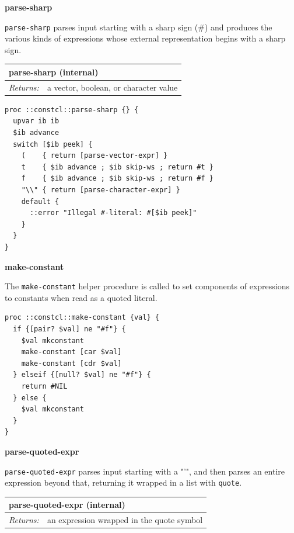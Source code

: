 \documentclass[twoside,9pt]{report}
\begin{document}
\textbf{parse-sharp}


\texttt{parse-sharp} parses input starting with a sharp sign (\#) and produces the various kinds of expressions whose external representation begins with a sharp sign.

\begin{tabular}{ |l l| }
\hline
\multicolumn{2}{|l|}{parse-sharp (internal)} \\
\hline
\textit{Returns:} & a vector, boolean, or character value \\
\hline
\end{tabular}

\noindent\makebox[\linewidth]{\rule{\linewidth}{0.4pt}}
\begin{lstlisting}
proc ::constcl::parse-sharp {} {
  upvar ib ib
  $ib advance
  switch [$ib peek] {
    (    { return [parse-vector-expr] }
    t    { $ib advance ; $ib skip-ws ; return #t }
    f    { $ib advance ; $ib skip-ws ; return #f }
    "\\" { return [parse-character-expr] }
    default {
      ::error "Illegal #-literal: #[$ib peek]"
    }
  }
}
\end{lstlisting}
\noindent\makebox[\linewidth]{\rule{\linewidth}{0.4pt}}

\textbf{make-constant}


The \texttt{make-constant} helper procedure is called to set components of expressions to constants when read as a quoted literal.

\noindent\makebox[\linewidth]{\rule{\linewidth}{0.4pt}}
\begin{lstlisting}
proc ::constcl::make-constant {val} {
  if {[pair? $val] ne "#f"} {
    $val mkconstant
    make-constant [car $val]
    make-constant [cdr $val]
  } elseif {[null? $val] ne "#f"} {
    return #NIL
  } else {
    $val mkconstant
  }
}
\end{lstlisting}
\noindent\makebox[\linewidth]{\rule{\linewidth}{0.4pt}}

\textbf{parse-quoted-expr}


\texttt{parse-quoted-expr} parses input starting with a "'", and then parses an entire expression beyond that, returning it wrapped in a list with \texttt{quote}.

\begin{tabular}{ |l l| }
\hline
\multicolumn{2}{|l|}{parse-quoted-expr (internal)} \\
\hline
\textit{Returns:} & an expression wrapped in the quote symbol \\
\hline
\end{tabular}
\end{document}
